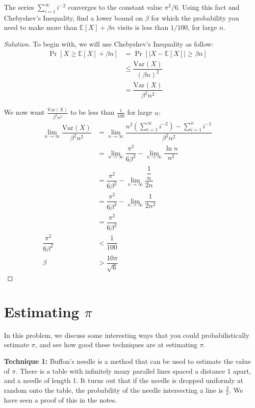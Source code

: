 \documentclass{article}
\newenvironment{solution}{\begin{proof}[Solution]}{\end{proof}}
\newcommand{\E}{\mathbb{E}}
\newcommand{\Var}{\mathrm{Var}}
\begin{document}
\begin{hw}
	The series $\sum_{i=1}^\infty i^{-2}$ converges to the constant value $\pi^2/6$. Using this fact and Chebyshev's Inequality, find a lower bound on $\beta$ for which the probability you need to make more than $\E[X] + \beta n$ visits is less than $1/100$, for large $n$.
\end{hw}
\begin{solution}
	To begin with, we will use Chebyshev's Inequality as follow:
	\begin{align*}
		\Pr[X \geq \E[X] + \beta n] &= \Pr[\lvert X - \E[X] \rvert \geq \beta n] \\
		&\leq \dfrac{\Var(X)}{(\beta n)^{2}} \\
		&= \dfrac{\Var(X)}{\beta^{2} n^{2}}
	\end{align*}

	We now want $\frac{\Var(X)}{\beta^{2} n^{2}}$ to be less than $\frac{1}{100}$ for large $n$:
	\begin{align*}
		\lim\limits_{n \rightarrow \infty} \dfrac{\Var(X)}{\beta^{2} n^{2}} &= \lim\limits_{n \rightarrow \infty} \dfrac{n^{2}\left( \sum_{i=1}^\infty i^{-2} \right) - \sum_{i = 1}^n i^{-1}}{\beta^{2} n^{2}} \\
		&= \lim\limits_{n \rightarrow \infty} \dfrac{\pi^{2}}{6\beta^{2}} - \lim\limits_{n \rightarrow \infty} \dfrac{\ln n}{n^{2}} \\
		&= \dfrac{\pi^{2}}{6\beta^{2}} - \lim\limits_{n \rightarrow \infty} \dfrac{\dfrac{1}{n}}{2n} \\
		&= \dfrac{\pi^{2}}{6\beta^{2}} - \lim\limits_{n \rightarrow \infty} \dfrac{1}{2n^{2}} \\
		&= \dfrac{\pi^{2}}{6\beta^{2}} \\
		\dfrac{\pi^{2}}{6\beta^{2}} &< \dfrac{1}{100} \\
		\beta &> \dfrac{10\pi}{\sqrt{6}}
	\end{align*}
\end{solution}

\newpage

\section{Estimating $\pi$}
In this problem, we discuss some interesting ways that you could probabilistically estimate $\pi$, and see how good these techniques are at estimating $\pi$.

\textbf{Technique 1:} Buffon's needle is a method that can be used to estimate the value of $\pi$. There is a table with infinitely many parallel lines spaced a distance 1 apart, and a needle of length 1. It turns out that if the needle is dropped uniformly at random onto the table, the probability of the needle intersecting a line is $\frac{2}{\pi}$. We have seen a proof of this in the notes.
\end{document}
